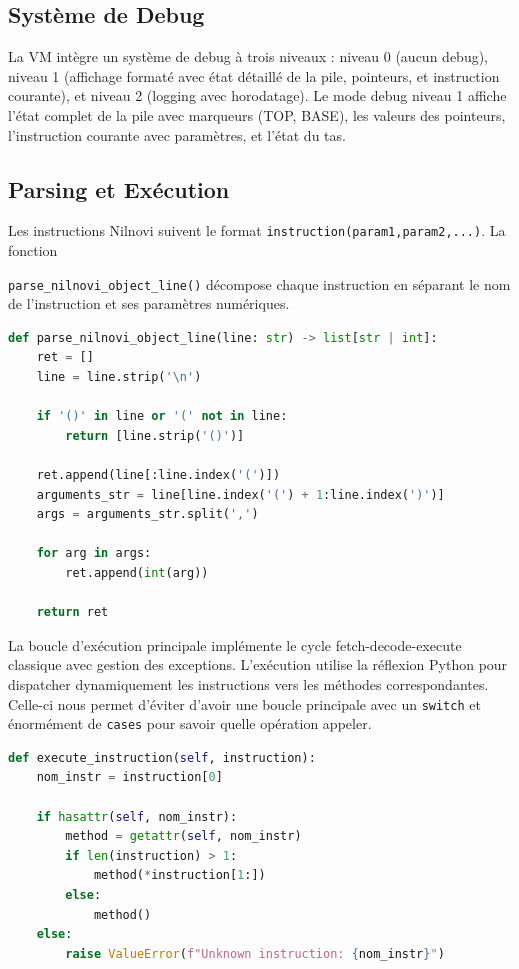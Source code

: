 \documentclass[a4paper, 12pt]{article}
\begin{document}
    \subsection{Système de Debug}

    La VM intègre un système de debug à trois niveaux : niveau 0 (aucun debug), niveau 1 (affichage formaté avec état détaillé de la pile, pointeurs, et instruction courante), et niveau 2 (logging avec horodatage). Le mode debug niveau 1 affiche l'état complet de la pile avec marqueurs (TOP, BASE), les valeurs des pointeurs, l'instruction courante avec paramètres, et l'état du tas.

    \subsection{Parsing et Exécution}

    Les instructions Nilnovi suivent le format \texttt{instruction(param1,param2,...)}. La fonction 

    \texttt{parse\_nilnovi\_object\_line()} décompose chaque instruction en séparant le nom de l'instruction et ses paramètres numériques. 

    \begin{lstlisting}[caption=Parsing d'instruction,language=python, xleftmargin=20pt]
def parse_nilnovi_object_line(line: str) -> list[str | int]:
    ret = []
    line = line.strip('\n')
    
    if '()' in line or '(' not in line:
        return [line.strip('()')]
    
    ret.append(line[:line.index('(')])
    arguments_str = line[line.index('(') + 1:line.index(')')]
    args = arguments_str.split(',')
    
    for arg in args: 
        ret.append(int(arg))
    
    return ret \end{lstlisting}

    La boucle d'exécution principale implémente le cycle fetch-decode-execute classique avec gestion des exceptions. L'exécution utilise la réflexion Python pour dispatcher dynamiquement les instructions vers les méthodes correspondantes. Celle-ci nous permet d'éviter d'avoir une boucle principale avec un \texttt{switch} et énormément de \texttt{cases} pour savoir quelle opération appeler.

    \begin{lstlisting}[caption=Dispatch dynamique des instructions,language=python, xleftmargin=20pt]
def execute_instruction(self, instruction):
    nom_instr = instruction[0]
    
    if hasattr(self, nom_instr):
        method = getattr(self, nom_instr)
        if len(instruction) > 1:
            method(*instruction[1:])
        else:
            method()
    else:
        raise ValueError(f"Unknown instruction: {nom_instr}") \end{lstlisting}
\end{document}

